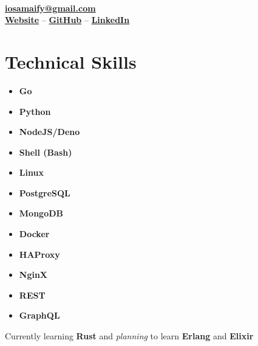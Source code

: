 \documentclass[letterpaper, 10pt]{article}
\author{Osama Muhammad}
\date{\today}
\makeatletter
\renewcommand{\maketitle}{
	\vspace{1.5em}
	\begin{center}
		\par{\huge\bfseries{\theauthor}}
		\vspace{0.7em}\\
		\href{mailto:iosamaify@gmail.com}{\textbf{iosamaify@gmail.com}}
		\vspace{0.7em}\\
		\href{https://osamai.github.io}{\textbf{Website}} --
		\href{https://github.com/osamai}{\textbf{GitHub}} --
		\href{https://www.linkedin.com/in/iosama}{\textbf{LinkedIn}}
	\end{center}
}
\newcommand{\hr}{\par{\vspace{-.3\ht\strutbox}\noindent\hrulefill\par}}
\makeatother
\begin{document}
\maketitle

\hr

\section{Technical Skills}

\begin{multicols}{3}
	\begin{itemize}
		\item \textbf{Go}
		\item \textbf{Python}
		\item \textbf{NodeJS/Deno}
		\item \textbf{Shell (Bash)}
		\item \textbf{Linux}
		\item \textbf{PostgreSQL}
		\item \textbf{MongoDB}
		\item \textbf{Docker}
		\item \textbf{HAProxy}
		\item \textbf{NginX}
		\item \textbf{REST}
		\item \textbf{GraphQL}
	\end{itemize}
\end{multicols}

Currently learning \textbf{Rust} and \textit{planning} to learn \textbf{Erlang} and \textbf{Elixir}
\end{document}
